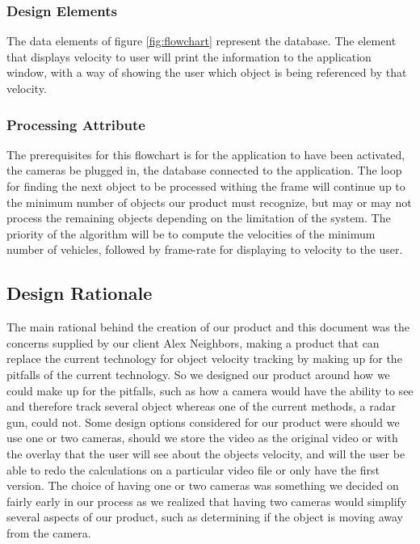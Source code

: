 \documentclass[letterpaper,10pt,onecolumn,draftclsnofoot]{IEEEtran}
\begin{document}
\subsubsection{Design Elements}
The data elements of figure \ref{fig:flowchart} represent the database. 
The element that displays velocity to user will print the information to the application window, with a way of showing the user which object is being referenced by that velocity.


\subsubsection{Processing Attribute}
The prerequisites for this flowchart is for the application to have been activated, the cameras be plugged in, the database connected to the application. 
The loop for finding the next object to be processed withing the frame will continue up to the minimum number of objects our product must recognize, but may or may not process the remaining objects depending on the limitation of the system.
The priority of the algorithm will be to compute the velocities of the minimum number of vehicles, followed by frame-rate for displaying to velocity to the user.




\subsection{Design Rationale}
The main rational behind the creation of our product and this document was the concerns supplied by our client Alex Neighbors, making a product that can replace the current technology for object velocity tracking by making up for the pitfalls of the current technology.
So we designed our product around how we could make up for the pitfalls, such as how a camera would have the ability to see and therefore track several object whereas one of the current methods, a radar gun, could not.
Some design options considered for our product were should we use one or two cameras, should we store the video as the original video or with the overlay that the user will see about the objects velocity, and will the user be able to redo the calculations on a particular video file or only have the first version. 
The choice of having one or two cameras was something we decided on fairly early in our process as we realized that having two cameras would simplify several aspects of our product, such as determining if the object is moving away from the camera. 
\end{document}
